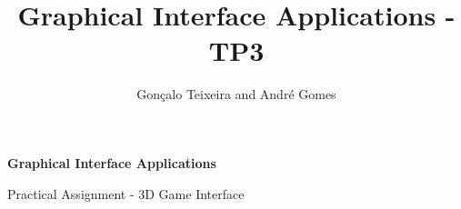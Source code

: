 \documentclass[11pt,a4paper]{article}
\author{Gonçalo Teixeira and André Gomes}
\title{Graphical Interface Applications - TP3}
\begin{document}
\begin{center}
    \Huge
    \textbf{Graphical Interface Applications}

    \vspace{0.5cm}
    \LARGE
     Practical Assignment - 3D Game Interface
\end{center}




\end{document}
